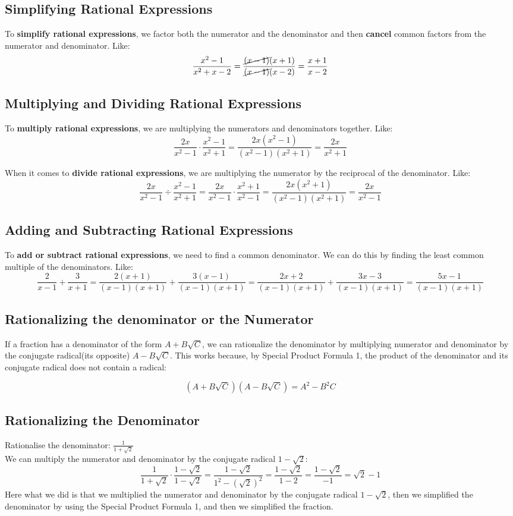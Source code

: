 \subsection{Simplifying Rational Expressions}
To \textbf{simplify rational expressions}, we factor both the numerator and the denominator and then \textbf{cancel} common factors from the numerator and denominator.
Like: $$ \frac{x^2-1}{x^2+x-2} = \frac{\cancel{(x-1)}(x+1)}{\cancel{(x-1)}(x-2)}=\frac{x+1}{x-2}$$


\subsection{Multiplying and Dividing Rational Expressions}
To \textbf{multiply rational expressions}, we are multiplying the numerators and denominators together. Like: $$ \frac{2x}{x^2-1} \cdot \frac{x^2-1}{x^2+1} = \frac{2x(x^2-1)}{(x^2-1)(x^2+1)} = \frac{2x}{x^2+1}$$ 

When it comes to \textbf{divide rational expressions}, we are multiplying the numerator by the reciprocal of the denominator. Like: $$ \frac{2x}{x^2-1} \div \frac{x^2-1}{x^2+1} = \frac{2x}{x^2-1} \cdot \frac{x^2+1}{x^2-1} = \frac{2x(x^2+1)}{(x^2-1)(x^2+1)} = \frac{2x}{x^2-1}$$

\subsection{Adding and Subtracting Rational Expressions}
To \textbf{add or subtract rational expressions}, we need to find a common denominator. We can do this by finding the least common multiple of the denominators. Like: $$ \frac{2}{x-1} + \frac{3}{x+1} = \frac{2(x+1)}{(x-1)(x+1)} + \frac{3(x-1)}{(x-1)(x+1)} = \frac{2x+2}{(x-1)(x+1)} + \frac{3x-3}{(x-1)(x+1)} = \frac{5x-1}{(x-1)(x+1)}$$

\subsection{Rationalizing the denominator or the Numerator}
If a fraction has a denominator of the form $A+B\sqrt{C}$, we can rationalize the denominator by multiplying numerator and denominator by the conjugate radical(its opposite) $A-B\sqrt{C}$.
This works because, by Special Product Formula 1, the product of the
denominator and its conjugate radical does not contain a radical:

$$ (A+B\sqrt{C})(A-B\sqrt{C})=A^2-B^2C$$

\subsection{Rationalizing the Denominator}
Rationalise the denominator: $\displaystyle \frac{1}{1+\sqrt{2}}$ \\ \break
We can multiply the numerator and denominator by the conjugate radical $1-\sqrt{2}$:
$$ \frac{1}{1+\sqrt{2}} \cdot \frac{1-\sqrt{2}}{1-\sqrt{2}} = \frac{1-\sqrt{2}}{1^2-(\sqrt{2})^2} = \frac{1-\sqrt{2}}{1-2} = \frac{1-\sqrt{2}}{-1} = \sqrt{2}-1$$
Here what we did is that we multiplied the numerator and denominator by the conjugate radical $1-\sqrt{2}$, then we simplified the denominator by using the Special Product Formula 1, and then we simplified the fraction.



